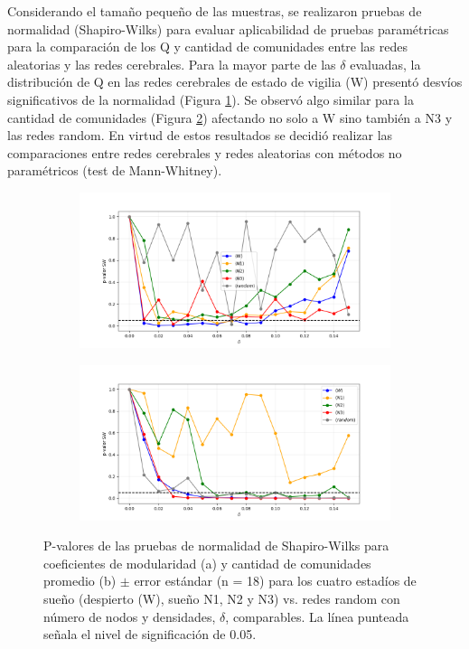 \documentclass{article}
\begin{document}
Considerando el tamaño pequeño de las muestras, se realizaron pruebas de normalidad (Shapiro-Wilks) para evaluar aplicabilidad de pruebas paramétricas para la comparación de los Q y cantidad de comunidades entre las redes aleatorias y las redes cerebrales.
Para la mayor parte de las $\delta$ evaluadas, la distribución de Q en las redes cerebrales de estado de vigilia (W) presentó desvíos significativos de la normalidad  (Figura \ref{fg_normal_mod}). Se observó algo similar para la cantidad de comunidades (Figura \ref{fg_normal_com}) afectando no solo a W sino también a N3 y las redes random. 
En virtud de estos resultados se decidió realizar las comparaciones entre redes cerebrales y redes aleatorias con métodos no paramétricos (test de Mann-Whitney). 

\begin{figure} [!htb]
	\centering
	\begin{subfigure}[b]{0.45\textwidth}
		\includegraphics[width= \textwidth]{fg/test_normal_modularidad.png}
        \caption{}
		\label{fg_normal_mod}
	\end{subfigure}
	\begin{subfigure}[b]{0.45\textwidth}
		\includegraphics[width= \textwidth]{fg/test_normal_comunidades.png}
        \caption{}
        \label{fg_normal_com}
	\end{subfigure}
	\caption{P-valores de las pruebas de normalidad de Shapiro-Wilks para coeficientes de modularidad (a) y cantidad de comunidades promedio (b) $\pm$  error estándar (n = 18) para los cuatro estadíos de sueño (despierto (W), sueño N1, N2 y N3) vs. redes random con número de nodos y densidades, $\delta$, comparables. La línea punteada señala el nivel de significación de 0.05.}	
    \label{fg:modularidad}
\end{figure}
\end{document}
